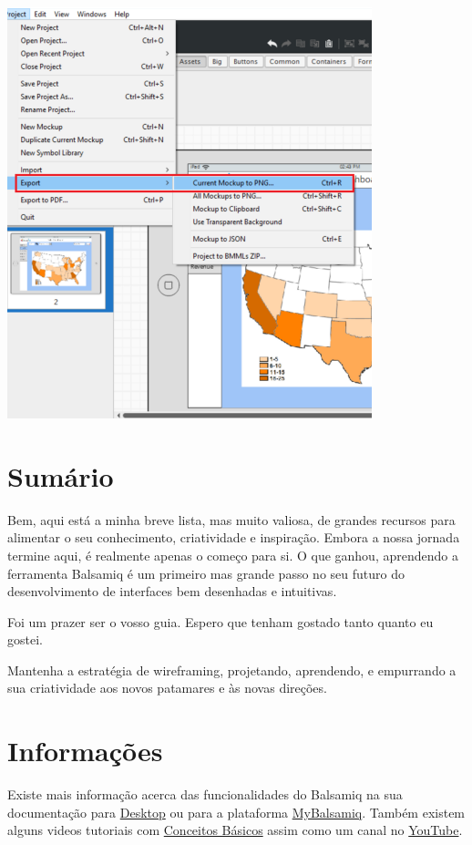 \documentclass{tufte-book} %
\begin{document}
\begin{center}
	\includegraphics{img24.png}
\end{center}

\chapter{Sumário}

Bem, aqui está a minha breve lista, mas muito valiosa, de grandes recursos para alimentar o seu conhecimento, criatividade e inspiração. Embora a nossa jornada termine aqui, é realmente apenas o começo para si. O que ganhou, aprendendo a ferramenta Balsamiq é um primeiro mas grande passo no seu futuro do desenvolvimento de interfaces bem desenhadas e intuitivas.

Foi um prazer ser o vosso guia. Espero que tenham gostado tanto quanto eu gostei.

Mantenha a estratégia de wireframing, projetando, aprendendo, e empurrando a sua criatividade aos novos patamares e às novas direções.

\chapter{Informações}

Existe mais informação acerca das funcionalidades do Balsamiq na sua documentação para \href{https://docs.balsamiq.com/desktop/}{Desktop} ou para a plataforma \href{https://docs.balsamiq.com/mybalsamiq/}{MyBalsamiq}. Também existem alguns videos tutoriais com \href{https://support.balsamiq.com/tutorials/}{Conceitos Básicos} assim como um canal no \href{https://www.youtube.com/balsamiq/}{YouTube}.
\end{document}

